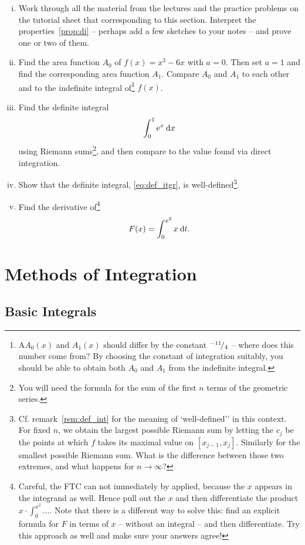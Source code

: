 \begin{exercise}
\begin{enumerate}[(i)]
	\item Work through all the material from the lectures and the practice problems on the tutorial sheet that corresponding to this section. Interpret the properties~\ref{prop:di} -- perhaps add a few sketches to your notes -- and prove one or two of them.
	\item Find the area function $A_0$ of $f(x)=x^3-6x$ with $a=0$. Then set $a=1$ and find the corresponding area function $A_1$. Compare $A_0$ and $A_1$ to each other and to the indefinite integral of\footnote{A$A_0(x)$ and $A_1(x)$ should differ by the constant ${}^{-11}\!/_{4}$ -- where does this number come from? By choosing the constant of integration suitably, you should be able to obtain both $A_0$ and $A_1$ from the indefinite integral.} $f(x)$.
	\item Find the definite integral
	\[ \int_{0}^{1} \mathrm{e}^x \: \mathrm{d} x \]
	using Riemann sums\footnote{You will need the formula for the sum of the first $n$ terms of the geometric series.}, and then compare to the value found via direct integration.
	\item Show that the definite integral, \eqref{eq:def_itgr}, is well-defined\footnote{Cf. remark~\ref{rem:def_int} for the meaning of `well-defined'' in this context. For fixed $n$, we obtain the largest possible Riemann sum by letting the $c_j$ be the points at which $f$ takes its maximal value on $[x_{j-1},x_j]$. Similarly for the smallest possible Riemann sum. What is the difference between those two extremes, and what happens for $n\to\infty$?}.
	\item Find the derivative of\footnote{Careful, the FTC can not immediately by applied, because the $x$ appears in the integrand as well. Hence pull out the $x$ and then differentiate the product $x \cdot \int_0^{x^2}\dots$. Note that there is a different way to solve this: find an explicit formula for $F$ in terms of $x$ -- without an integral -- and then differentiate. Try this approach as well and make sure your answers agree!}
	\[ F(x) = \int_{0}^{x^2} x \: \mathrm{d} t. \]
\end{enumerate}
\end{exercise}


\section{Methods of Integration}

\subsection{Basic Integrals}

